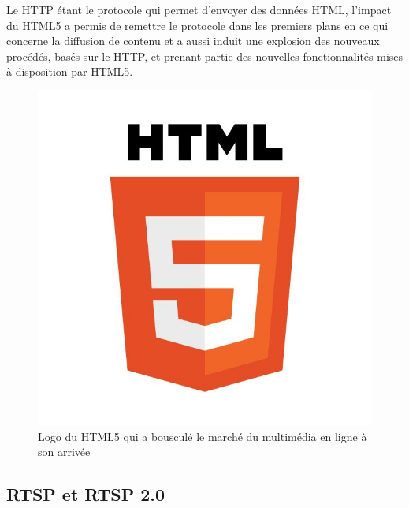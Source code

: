 \documentclass{polytech/polytech}
\begin{document}
Le HTTP étant le protocole qui permet d’envoyer des données HTML, l’impact du HTML5 a permis de remettre le protocole dans les premiers plans en ce qui concerne la diffusion de contenu et a aussi induit une explosion des nouveaux procédés, basés sur le HTTP, et prenant partie des nouvelles fonctionnalités mises à disposition par HTML5.

\begin{figure}
	\includegraphics[scale=0.25]{images/html5logo}
	\caption{Logo du HTML5 qui a bousculé le marché du multimédia en ligne à son arrivée}
	\label{fig:html5logo}
\end{figure}

\subsection{RTSP et RTSP 2.0}
\label{subsec:rtsp}
\end{document}
